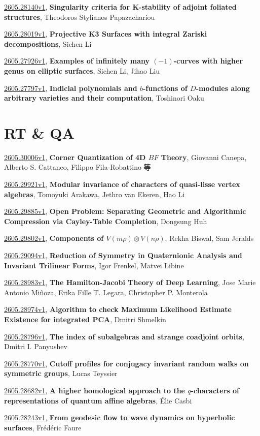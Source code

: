 \documentclass[9pt, a4paper]{article}
\theoremstyle{plain}
\theoremstyle{definition}
\theoremstyle{remark}
\newcommand{\arxiv}[3]{\href{https://arxiv.org/abs/#1}{#1}, \textbf{\textcolor{arxivblue}{#2}}, #3}
\begin{document}
\arxiv{2605.28140v1}{Singularity criteria for K-stability of adjoint foliated structures}{Theodoros Stylianos Papazachariou}

\arxiv{2605.28019v1}{Projective K3 Surfaces with integral Zariski decompositions}{Sichen Li}

\arxiv{2605.27926v1}{Examples of infinitely many $(-1)$-curves with higher genus on elliptic surfaces}{Sichen Li, Jihao Liu}

\arxiv{2605.27797v1}{Indicial polynomials and $b$-functions of $D$-modules along arbitrary varieties and their computation}{Toshinori Oaku}


\section{RT \& QA}
\arxiv{2605.30006v1}{Corner Quantization of 4D $BF$ Theory}{Giovanni Canepa, Alberto S. Cattaneo, Filippo Fila-Robattino 等}

\arxiv{2605.29921v1}{Modular invariance of characters of quasi-lisse vertex algebras}{Tomoyuki Arakawa, Jethro van Ekeren, Hao Li}

\arxiv{2605.29885v1}{Open Problem: Separating Geometric and Algorithmic Compression via Cayley-Table Completion}{Dongsung Huh}

\arxiv{2605.29802v1}{Components of $V(mρ) \otimes V(nρ)$}{Rekha Biswal, Sam Jeralds}

\arxiv{2605.29094v1}{Reduction of Symmetry in Quaternionic Analysis and Invariant Trilinear Forms}{Igor Frenkel, Matvei Libine}

\arxiv{2605.28983v1}{The Hamilton-Jacobi Theory of Deep Learning}{Jose Marie Antonio Miñoza, Erika Fille T. Legara, Christopher P. Monterola}

\arxiv{2605.28974v1}{Algorithm to check Maximum Likelihood Estimate Existence for integrated PCA}{Dmitri Shmelkin}

\arxiv{2605.28796v1}{The index of subalgebras and strange coadjoint orbits}{Dmitri I. Panyushev}

\arxiv{2605.28770v1}{Cutoff profiles for conjugacy invariant random walks on symmetric groups}{Lucas Teyssier}

\arxiv{2605.28682v1}{A higher homological approach to the $q$-characters of representations of quantum affine algebras}{Élie Casbi}

\arxiv{2605.28243v1}{From geodesic flow to wave dynamics on hyperbolic surfaces}{Frédéric Faure}
\end{document}
